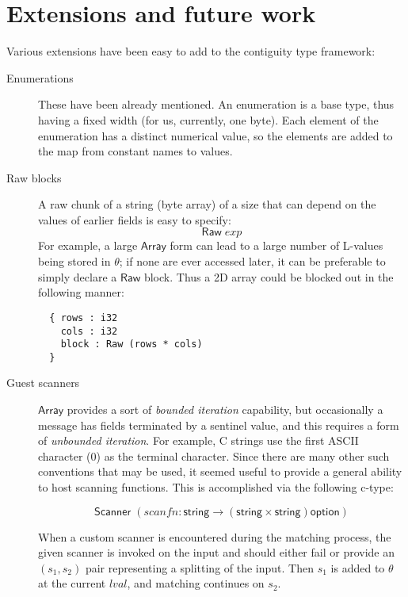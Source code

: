 \documentclass[svgnames]{llncs}
\newcommand{\konst}[1]{\ensuremath{\mathsf{#1}}}
\newcommand{\lval}{\ensuremath{\mathit{lval}}}
\begin{document}
\section{Extensions and future work}

Various extensions have been easy to add to the contiguity type
framework:

\begin{description}

\item [Enumerations] These have been already mentioned. An enumeration
  is a base type, thus having a fixed width (for us, currently, one
  byte). Each element of the enumeration has a distinct numerical
  value, so the elements are added to the map from constant names to values.

\item [Raw blocks] A raw chunk of a string (byte array) of a size that
  can depend on the values of earlier fields is easy to specify:
  \[ \konst{Raw}\; \mathit{exp} \]
For example, a large \konst{Array} form can lead to a large number of
L-values being stored in $\theta$; if none are ever accessed later, it
can be preferable to simply declare a \konst{Raw} block. Thus a 2D
array could be blocked out in the following manner:

\begin{verbatim}
  { rows : i32
    cols : i32
    block : Raw (rows * cols)
  }
\end{verbatim}

\item [Guest scanners] \konst{Array} provides a sort of \emph{bounded
  iteration} capability, but occasionally a message has fields
  terminated by a sentinel value, and this requires a form of
  \emph{unbounded iteration}. For example, C strings use the first
  ASCII character (0) as the terminal character. Since there are many
  other such conventions that may be used, it seemed useful to provide
  a general ability to host scanning functions. This is accomplished via the following c-type:

  \[ \konst{Scanner}\;
     (\mathit{scanfn} : \konst{string} \to (\konst{string} \times \konst{string})\konst{option}) \]

  When a custom scanner is encountered during the matching process,
  the given scanner is invoked on the input and should either fail or
  provide an $(s_1,s_2)$ pair representing a splitting of the
  input. Then $s_1$ is added to $\theta$ at the current \lval, and
  matching continues on $s_2$.


\end{description}
\end{document}
